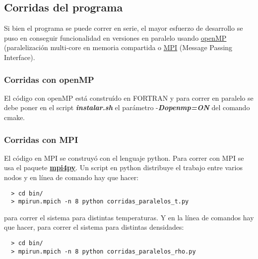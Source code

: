 \subsection{Corridas del programa}

Si bien el programa se puede correr en serie, el mayor esfuerzo de desarrollo se puso en conseguir
funcionalidad en versiones en paralelo 
 usando  \href{http://openmp.org/}{openMP} 
(paralelización multi-core en memoria compartida   o \href{http://www.open-mpi.org/}{MPI} (Message Passing Interface).

\begin{comment}
\subsubsection{Corridas en serie}
Para correr en serie se debe poner en el script \textbf{\textit{instalar.sh}}
el parámetro -\textbf{\textit{Dopenmp=OFF}} del comando cmake.
\end{comment}

\subsubsection{Corridas con openMP}
El código con openMP está construído en FORTRAN y para correr en paralelo se debe poner en el script \textbf{\textit{instalar.sh}}
el parámetro -\textbf{\textit{Dopenmp=ON}} del comando cmake.

\subsubsection{Corridas con MPI}

El código en MPI se construyó con el lenguaje python. Para correr con MPI se usa 
el paquete \href{http://mpi4py.scipy.org/} {\textbf{mpi4py}}.
Un script en python distribuye el trabajo entre varios nodos  y en línea de comando
hay que hacer:

\begin{verbatim}
  > cd bin/
  > mpirun.mpich -n 8 python corridas_paralelos_t.py
\end{verbatim}

para correr el sistema para distintas temperaturas. Y en la línea
de comandos hay que hacer, para correr el sistema para distintas densidades:

\begin{verbatim}
  > cd bin/
  > mpirun.mpich -n 8 python corridas_paralelos_rho.py
\end{verbatim}



